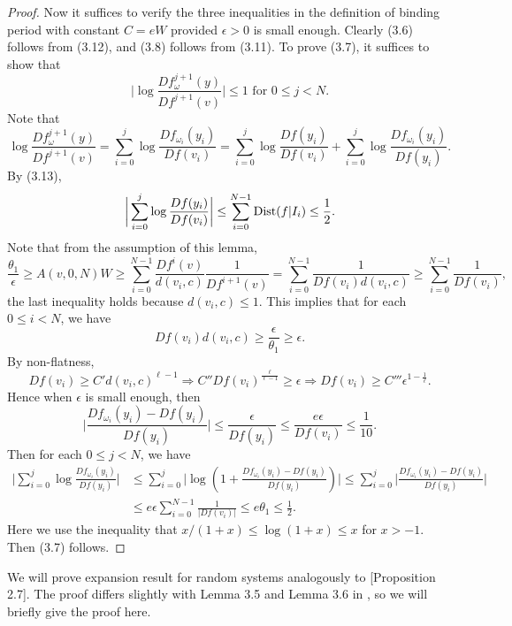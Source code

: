 \documentclass[11pt,oneside]{article}
\theoremstyle{plain}
\numberwithin{equation}{section}
\numberwithin{figure}{section}
\numberwithin{table}{section}
\begin{document}
\begin{proof}
Now it suffices to verify the three inequalities in the definition of binding period with constant $C = eW$ provided $\epsilon >0$ is small enough. Clearly (3.6) follows from (3.12), and (3.8) follows from (3.11). To prove (3.7), it suffices to show that 
\[
\bigg| \log \frac{Df_{\omega}^{j+1}(y)}{Df^{j+1}(v)} \bigg| \leq 1 \text{ for } 0 \leq j < N.
\]
Note that
\[
\log \frac{Df_{\omega}^{j+1}(y)}{Df^{j+1}(v)} = \sum_{i=0}^j \log \frac{Df_{\omega_i}(y_i)}{Df(v_i)} =  \sum_{i=0}^j \log \frac{Df(y_i)}{Df(v_i)} +  \sum_{i=0}^j \log \frac{Df_{\omega_i}(y_i)}{Df(y_i)}.
\]
By (3.13), 
\[
\bigg| \sum_{i=0}^j \log \frac{Df(y_i)}{Df(v_i)}\bigg| \leq \sum_{i=0}^{N-1} {\rm Dist}(f|I_i) \leq \frac{1}{2}.
\]
Note that from the assumption of this lemma, 
\[
\frac{\theta_1}{\epsilon} \geq A(v, 0, N) W \geq \sum_{i=0}^{N-1} \frac{Df^i(v)}{d(v_i, c)} \frac{1}{Df^{i+1}(v)} =  \sum_{i=0}^{N-1} \frac{1}{Df(v_i)d(v_i, c)} \geq \sum_{i=0}^{N-1} \frac{1}{Df(v_i)},
\]
the last inequality holds because $d(v_i, c) \leq 1$. This implies that for each $0 \leq i < N$, we have
\[
Df(v_i)d(v_i, c) \geq \frac{\epsilon}{\theta_1} \geq \epsilon.
\]
By non-flatness,
\[
Df(v_i) \geq C' d(v_i, c)^{\ell -1} \Longrightarrow C'' Df(v_i)^{\frac{\ell}{\ell-1}} \geq \epsilon \Longrightarrow Df(v_i) \geq C''' \epsilon^{1 - \frac{1}{\ell}}.
\]
Hence when $\epsilon$ is small enough, then 
\[
\bigg| \frac{Df_{\omega_i}(y_i) - Df(y_i)}{Df(y_i)} \bigg| \leq \frac{\epsilon}{Df(y_i)} \leq \frac{e \epsilon}{Df(v_i)} \leq \frac{1}{10}.
\]
Then for each $0 \leq j < N$, we have
\begin{align*}
\bigg| \sum_{i=0}^j \log \frac{Df_{\omega_i}(y_i)}{Df(y_i)} \bigg| & \leq \sum_{i=0}^j \bigg| \log\left(1 + \frac{Df_{\omega_i}(y_i) - Df(y_i)}{Df(y_i)}  \right) \bigg| \leq  \sum_{i=0}^j \bigg|  \frac{Df_{\omega_i}(y_i) - Df(y_i)}{Df(y_i)} \bigg| \\
& \leq e\epsilon \sum_{i=0}^{N-1} \frac{1}{|Df(v_i)|} \leq e \theta_1 \leq \frac{1}{2}.
\end{align*}
Here we use the inequality that $x/(1+x) \leq \log(1+x) \leq x$ for $x > -1$. Then (3.7) follows.

\end{proof}
\fi


We will prove expansion result for random systems analogously to \cite{S}[Proposition 2.7]. The proof differs slightly with Lemma 3.5 and Lemma 3.6 in \cite{LR}, so we will briefly give the proof here.
\end{document}
